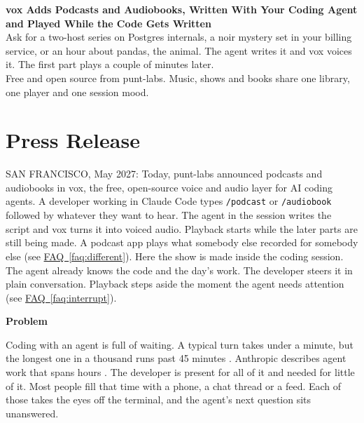 \documentclass[11pt,letterpaper]{article} %
\newcommand{\prsection}[1]{%
  \vspace{1em}%
  {\large\bfseries\color{SectionBlue}#1}%
  \vspace{0.3em}\par%
}
\newcommand{\faqref}[1]{\hyperref[#1]{FAQ~\ref*{#1}}}
\begin{document}
\begin{center} %
  {\LARGE\bfseries\color{SectionBlue}
    vox Adds Podcasts and Audiobooks, Written With Your Coding Agent
    and Played While the Code Gets Written} \\[0.8em]
  {\large\color{AccentGray}
    Ask for a two-host series on Postgres internals, a noir mystery set in
    your billing service, or an hour about pandas, the animal. The agent
    writes it and vox voices it. The first part plays a couple of minutes
    later.} \\[0.3em]
  {\large\color{AccentGray}
    Free and open source from punt-labs. Music, shows and books share one
    library, one player and one session mood.}
\end{center}

\vspace{0.5em}


\section*{Press Release}

SAN FRANCISCO, May 2027: Today, punt-labs announced podcasts and audiobooks
in vox, the free, open-source voice and audio layer for AI coding agents. A
developer working in Claude Code types \texttt{/podcast} or
\texttt{/audiobook} followed by whatever they want to hear. The agent in the
session writes the script and vox turns it into voiced audio. Playback
starts while the later parts are still being made. A podcast app plays
what somebody else recorded for somebody else
(see \faqref{faq:different}). Here the show is made inside the coding
session. The agent already knows the code and the day's work. The developer
steers it in plain conversation. Playback steps aside the moment the agent
needs attention (see \faqref{faq:interrupt}).

\prsection{Problem}

Coding with an agent is full of waiting. A typical turn takes under a
minute, but the longest one in a thousand runs past 45 minutes
\cite{anthropic2026agentautonomy}. Anthropic describes agent work that
spans hours \cite{anthropic2026longrunnagents}. The developer is present
for all of it and needed for little of it. Most people fill that time with
a phone, a chat thread or a feed. Each of those takes the eyes off the
terminal, and the agent's next question sits unanswered.
\end{document}
